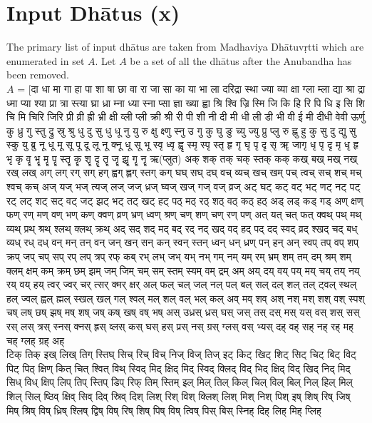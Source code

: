 \section{Input Dhātus (x)}
The primary list of input dhātus are taken from Madhaviya Dhātuvṛtti which are enumerated in set $A$. Let $A$ be a set of all the dhātus after the Anubandha has been removed.\\

$A$ = [\texthindi{दा धा मा गा हा पा शा षा छा वा रा जा सा का या भा ला दरिद्रा स्था ज्या व्या क्षा ग्ला म्ला द्या श्रा द्रा ध्मा प्या श्या प्रा त्रा स्त्या घ्रा ध्रा म्ना ध्या स्ना प्सा ज्ञा ख्या ह्वा श्रि श्वि ज्रि स्मि जि कि हि रि पि धि इ सि शि चि मि चिरि जिरि प्री व्री ह्री भ्री क्षी व्ली प्ली क्री श्री री पी शी नी दी मी धी ली डी भी वी ई मी दीधी वेवी ऊर्णु कु ध्रु गु स्तु द्रु स्रु श्रु धु दु सु धु धू नु यु रु क्षु क्ष्णु स्नु उ गु कु घु ङु च्यु ज्यु प्रु प्लु रु ह्नु हु कु सु दु द्यु सु स्कु यु ब्रु नू धू मू सू पू दू लू नू क्नू धू सू भू स्वृ ध्वृ ह्वृ स्मृ स्पृ स्तृ हृ गृ घृ पृ दृ सृ ॠ जागृ धृ पृ दृ मृ धृ हृ भृ कृ वॄ भॄ मॄ पॄ स्तॄ कॄ शॄ दॄ तॄ जॄ झॄ गॄ नॄ ऋ(प्लुत) अक् शक् तक् चक् स्तक् कक् कख् बख् मख् नख् रख् लख् अग् लग् रग् सग् हग् ह्वग् ह्लग् स्तग् कग् घघ् सघ् दघ् वच् व्यच् खच् खम् पच् त्वच् सच् शच् मच् श्वच् कच् अज् यज् भज् त्यज् लज् जज् ध्रज् घ्वज् खज् गज् वज् व्रज् अट् घट् कट् वट् भट् णट् नट् पट् रट् लट् शट् सट् वट् जट् झट् भट् तट् खट् हट् पठ् मठ् रठ् शठ् वठ् कठ् हठ् अड् लड् कड् गड् अण् क्षण् फण् रण् मण् वण् भण् कण् क्वण् व्रण् भ्रण् ध्वण् श्रण् चण् शण् चण् रण् पण् अत् यत् चत् फत् क्वथ् पथ् मथ् व्यथ् प्रथ् श्रथ् श्लथ् क्लथ् क्रथ् अद् सद् शद् मद् बद् रद् नद् खद् वद् हद् पद् दद् स्वद् व्रद् श्खद् चद् बध् व्यध् रध् दध् वन् मन् तन् वन् जन् खन् सन् कन् स्वन् स्तन् ध्वन् धन् ध्रण् पन् हन् अन् स्वप् तप् वप् शप् क्रप् जप् चप् सप् रप् लप् त्रप् रफ् कब् रभ् लभ् जभ् यभ् नभ् गम् नम् यम् रम् भ्रम् शम् तम् दम् श्रम् शम् क्लम् क्षम् कम् क्रम् छम् झम् जम् जिम् चम् सम् स्तम् स्यम् वम् द्रम् अम् अय् दय् वय् पय् मय् चय् तय् नय् रय् वय् हय् त्वर् ज्वर् चर् त्सर् क्मर् क्षर् अल् फल् चल् जल् नल् पल् बल् सल् दल् शल् तल् ट्वल् स्थल् हल् ज्वल् ह्वल् ह्मल् स्खल् खल् गल् श्वल् मल् शल् वल् भल् कल् अव् मव् शव् अश् नश् मश् शश् वश् स्पश् चष् लष् छष् झष् मष् शष् जष् कष् खष् वष् भष् अस् उध्रस् ध्रस् घस् जस् तस् दस् मस् यस् वस् शस् सस् रस् लस् त्रस् स्नस् क्नस् ह्रस् व्लस् कस् घस् हस् प्रस् नस् ग्रस् ग्लस् वस् भ्यस् दह् वह् सह् नह् रह् मह् चह् ग्लह् ग्रह् अह् \\
	टिक् तिक् इख् लिख् तिग् स्तिघ् सिच् रिच् विच् निज् विज् तिज् इट् किट् खिट् शिट् सिट् चिट् बिट् विट् पिट् पिठ् क्षिण् कित् चित् श्वित् विथ् स्विद् मिद् क्षिद् मिद् स्विद् क्लिद् विद् भिद् क्षिद् विद् खिद् निद् मिद् सिध् विध् क्षिप् लिप् तिप् स्तिप् डिप् रिफ् तिम् स्तिम् इल् मिल् तिल् किल् चिल् विल् बिल् निल् हिल् मिल् शिल् सिल् ष्ठिव् क्षिव् सिव् दिव् स्रिव् दिश् लिश् रिश् विश् क्लिश् लिश् मिश् निश् पिश् इष् शिष् रिष् जिष् मिष् श्रिष् विष् ध्रिष् श्लिष् द्विष् विष् रिष् शिष् पिष् विष् त्विष् पिस् बिस् स्निह् दिह् लिह् मिह् प्लिह् \\
}
